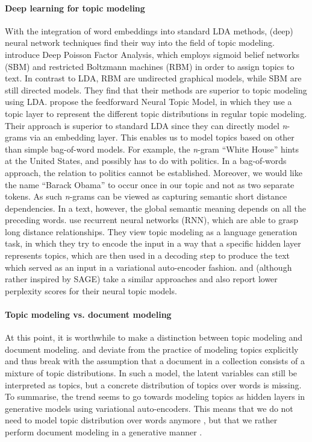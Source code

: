 \paragraph{Deep learning for topic modeling} With the integration of word embeddings into standard LDA methods, (deep) neural network techniques find their way into the field of topic modeling. \citet{ganscalable2015} introduce Deep Poisson Factor Analysis, which employs sigmoid belief networks (SBM) and restricted Boltzmann machines (RBM) in order to assign topics to text. In contrast to LDA, RBM are undirected graphical models, while SBM are still directed models. They find that their methods are superior to topic modeling using LDA. \citet{cao_novel_2015} propose the feedforward Neural Topic Model, in which they use a topic layer to represent the different topic distributions in regular topic modeling. Their approach is superior to standard LDA since they can directly model \textit{n}-grams via an embedding layer. This enables us to model topics based on other than simple bag-of-word models. For example, the \textit{n}-gram ``White House'' hints at the United States, and possibly has to do with politics. In a bag-of-words approach, the relation to politics cannot be established. Moreover, we would like the name ``Barack Obama'' to occur once in our topic and not as two separate tokens. As such \textit{n}-grams can be viewed as capturing semantic short distance dependencies. In a text, however, the global semantic meaning depends on all the preceding words. \citet{DiengWGP16} use recurrent neural networks (RNN), which are able to grasp long distance relationships. They view topic modeling as a language generation task, in which they try to encode the input in a way that a specific hidden layer represents topics, which are then used in a decoding step to produce the text which served as an input in a variational auto-encoder fashion. \citet{miao_neural_2016}  and \citet{CardTS17} (although rather inspired by SAGE) take a similar approaches and also report lower perplexity scores for their neural topic models.

\paragraph{Topic modeling vs. document modeling} At this point, it is worthwhile to make a distinction between topic modeling and document modeling. \citet{miao_neural_2016} and \citet{CardTS17} deviate from the practice of modeling topics explicitly and thus break with the assumption that a document in a collection consists of a mixture of topic distributions. In such a model, the latent variables can still be interpreted as topics, but a concrete distribution of topics over words is missing. To summarise, the trend seems to go towards modeling topics as hidden layers in generative models using variational auto-encoders. This means that we do not need to model topic distribution over words anymore \citep{Srivastava2016NeuralVI}, but that we rather perform document modeling in a generative manner \citep{MiaoGB17}.

